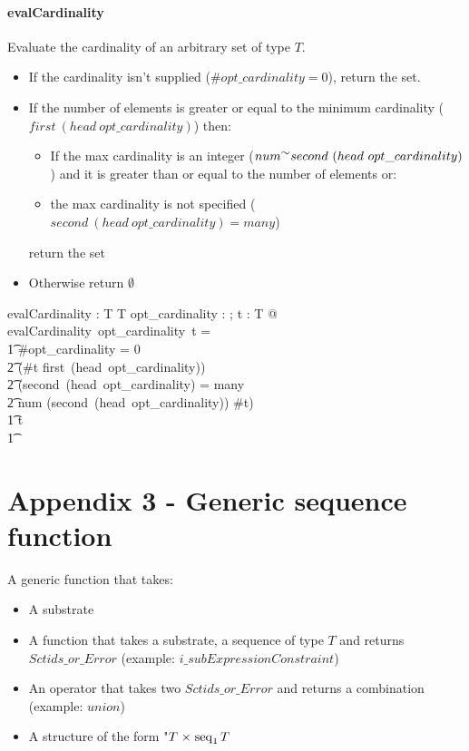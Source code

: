 \documentclass{article}
\begin{document}
\paragraph{evalCardinality}
Evaluate the cardinality of an arbitrary set of type $T$.  
\begin{itemize}[noitemsep,nolistsep]
\item If the cardinality isn't supplied ($\#opt\_cardinality = 0$), return the set.
\item If the number of elements is greater or equal to the minimum cardinality ($first~(head~opt\_cardinality)$) then:
\begin{itemize}[noitemsep,nolistsep]
\item If the max cardinality is an integer ($num \inv second~(head~opt\_cardinality)$) and it is greater than or equal to the number of elements or:
\item the max cardinality is not specified ($second~(head~opt\_cardinality) = many$)
\end{itemize}
return the set
\item Otherwise return $\emptyset$
\end{itemize}

\begin{gendef}[T]
   evalCardinality : \optional[cardinality] \fun \power T \fun \power T
\where
   \forall opt\_cardinality : \optional[cardinality]; t : \power T @ \\
evalCardinality~opt\_cardinality~t = \\
\t1 \IF \#opt\_cardinality = 0 \lor \\
\t2 (\#t \geq first~(head~opt\_cardinality)) \land \\
\t2 (second~(head~opt\_cardinality) = many \lor \\
\t2 num \inv (second~(head~opt\_cardinality)) \geq \#t) \\
\t1 \THEN t \\
\t1 \ELSE  \emptyset
\end{gendef}

\section{Appendix 3 - Generic sequence function}
A generic function that takes:
\begin{itemize}[noitemsep]
\item A substrate
\item A function that takes a substrate, a sequence of type $T$ and returns $Sctids\_or\_Error$  (example: $i\_subExpressionConstraint$)
\item An operator that takes two $Sctids\_or\_Error$ and returns a combination (example: $union$)
\item A structure of the form "$T \mathrel{\times} \mathop{\mathrm{seq}}_1 T$
\end{itemize}
\end{document}
